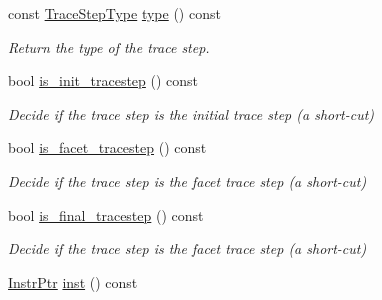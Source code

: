 \begin{DoxyCompactItemize}
\mbox{\label{classilang_1_1_trace_step_a741d4d9cbf77376a43c311abfecddf1b}} 
const \mbox{\hyperlink{classilang_1_1_trace_step_af2fb22e1a0aeacee818188a3e14c46dd}{Trace\+Step\+Type}} \mbox{\hyperlink{classilang_1_1_trace_step_a741d4d9cbf77376a43c311abfecddf1b}{type}} () const
\begin{DoxyCompactList}\small\item\em Return the type of the trace step. \end{DoxyCompactList}\item 
\mbox{\label{classilang_1_1_trace_step_a562a1a6df9047d9527219edbd83d591b}} 
bool \mbox{\hyperlink{classilang_1_1_trace_step_a562a1a6df9047d9527219edbd83d591b}{is\+\_\+init\+\_\+tracestep}} () const
\begin{DoxyCompactList}\small\item\em Decide if the trace step is the initial trace step (a short-\/cut) \end{DoxyCompactList}\item 
\mbox{\label{classilang_1_1_trace_step_a24d43d73d572afa91eeb4e477e626baf}} 
bool \mbox{\hyperlink{classilang_1_1_trace_step_a24d43d73d572afa91eeb4e477e626baf}{is\+\_\+facet\+\_\+tracestep}} () const
\begin{DoxyCompactList}\small\item\em Decide if the trace step is the facet trace step (a short-\/cut) \end{DoxyCompactList}\item 
\mbox{\label{classilang_1_1_trace_step_a7e216aea9c0ad3612f8d7238056597ca}} 
bool \mbox{\hyperlink{classilang_1_1_trace_step_a7e216aea9c0ad3612f8d7238056597ca}{is\+\_\+final\+\_\+tracestep}} () const
\begin{DoxyCompactList}\small\item\em Decide if the trace step is the facet trace step (a short-\/cut) \end{DoxyCompactList}\item 
\mbox{\label{classilang_1_1_trace_step_ad46be2e7ab006f89051c91dd939ece7a}} 
\mbox{\hyperlink{namespaceilang_af88a19312ae653d687a0d1207bb284f6}{Instr\+Ptr}} \mbox{\hyperlink{classilang_1_1_trace_step_ad46be2e7ab006f89051c91dd939ece7a}{inst}} () const

\end{DoxyCompactItemize}
